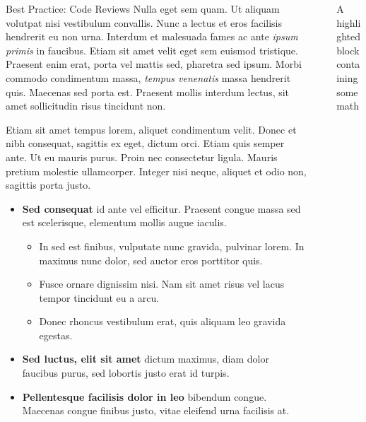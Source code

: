 \documentclass[final]{beamer}
\newlength{\sepwidth}
\newlength{\colwidth}
\newcommand{\separatorcolumn}{\begin{column}{\sepwidth}\end{column}}
\begin{document}
\begin{frame}[t]
\begin{columns}[t]
\begin{column}{\colwidth}
\begin{block}{Best Practice: Code Reviews}
    Nulla eget sem quam. Ut aliquam volutpat nisi vestibulum convallis. Nunc a
    lectus et eros facilisis hendrerit eu non urna. Interdum et malesuada fames
    ac ante \textit{ipsum primis} in faucibus. Etiam sit amet velit eget sem
    euismod tristique. Praesent enim erat, porta vel mattis sed, pharetra sed
    ipsum. Morbi commodo condimentum massa, \textit{tempus venenatis} massa
    hendrerit quis. Maecenas sed porta est. Praesent mollis interdum lectus,
    sit amet sollicitudin risus tincidunt non.

    Etiam sit amet tempus lorem, aliquet condimentum velit. Donec et nibh
    consequat, sagittis ex eget, dictum orci. Etiam quis semper ante. Ut eu
    mauris purus. Proin nec consectetur ligula. Mauris pretium molestie
    ullamcorper. Integer nisi neque, aliquet et odio non, sagittis porta justo.

    \begin{itemize}
      \item \textbf{Sed consequat} id ante vel efficitur. Praesent congue massa
        sed est scelerisque, elementum mollis augue iaculis.
        \begin{itemize}
          \item In sed est finibus, vulputate
            nunc gravida, pulvinar lorem. In maximus nunc dolor, sed auctor eros
            porttitor quis.
          \item Fusce ornare dignissim nisi. Nam sit amet risus vel lacus
            tempor tincidunt eu a arcu.
          \item Donec rhoncus vestibulum erat, quis aliquam leo
            gravida egestas.
        \end{itemize}
      \item \textbf{Sed luctus, elit sit amet} dictum maximus, diam dolor
        faucibus purus, sed lobortis justo erat id turpis.
      \item \textbf{Pellentesque facilisis dolor in leo} bibendum congue.
        Maecenas congue finibus justo, vitae eleifend urna facilisis at.
    \end{itemize}

  \end{block}

\end{column}

\separatorcolumn

\begin{column}{\colwidth}

  \begin{exampleblock}{A highlighted block containing some math}


\end{exampleblock}
\end{column}
\end{columns}
\end{frame}
\end{document}
